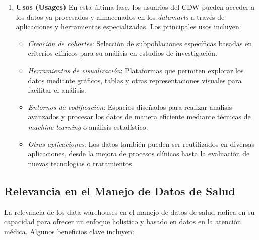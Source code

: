 \documentclass[12pt, a4paper, twoside]{article}
\begin{document}
\begin{enumerate}
		\item \textbf{Usos (Usages)}  
		En esta última fase, los usuarios del CDW pueden acceder a los datos ya procesados y almacenados en los \textit{datamarts} a través de aplicaciones y herramientas especializadas. Los principales usos incluyen:
		\begin{itemize}
			\item \textit{Creación de cohortes}: Selección de subpoblaciones específicas basadas en criterios clínicos para su análisis en estudios de investigación.  
			\item \textit{Herramientas de visualización}: Plataformas que permiten explorar los datos mediante gráficos, tablas y otras representaciones visuales para facilitar el análisis.  
			\item \textit{Entornos de codificación}: Espacios diseñados para realizar análisis avanzados y procesar los datos de manera eficiente mediante técnicas de \textit{machine learning} o análisis estadístico.  
			\item \textit{Otras aplicaciones}: Los datos también pueden ser reutilizados en diversas aplicaciones, desde la mejora de procesos clínicos hasta la evaluación de nuevas tecnologías o tratamientos.
		\end{itemize}
	\end{enumerate}
	
	
	
	\subsection{Relevancia en el Manejo de Datos de Salud}

	La relevancia de los data warehouses en el manejo de datos de salud radica en su capacidad para ofrecer un enfoque holístico y basado en datos en la atención médica. Algunos beneficios clave incluyen\cite{turcan2022}:
	
\end{document}
